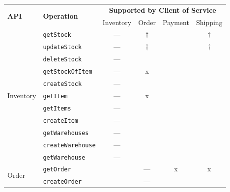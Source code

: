 \begin{table}[!htb]
    \centering
    \begin{tabular}{@{}llcccc@{}}
        \toprule
        \multirow{2}{*}{\textbf{\ac{API}}}  & \multirow{2}{*}{\textbf{Operation}}   & \multicolumn{4}{c}{\textbf{Supported by Client of Service}} \\
                                            &                                       & Inventory & Order     & Payment   & Shipping \\
        \midrule
        \multirow{11}{*}{Inventory}         & \texttt{getStock}                     & ---       & $\dagger$ &           & $\dagger$ \\
                                            & \texttt{updateStock}                  & ---       & $\dagger$ &           & $\dagger$ \\
                                            & \texttt{deleteStock}                  & ---       &           &           & \\
                                            & \texttt{getStockOfItem}               & ---       & x         &           & \\
                                            & \texttt{createStock}                  & ---       &           &           & \\
                                            & \texttt{getItem}                      & ---       & x         &           & \\
                                            & \texttt{getItems}                     & ---       &           &           & \\
                                            & \texttt{createItem}                   & ---       &           &           & \\
                                            & \texttt{getWarehouses}                & ---       &           &           & \\
                                            & \texttt{createWarehouse}              & ---       &           &           & \\
                                            & \texttt{getWarehouse}                 & ---       &           &           & \\
        \midrule
        \multirow{4}{*}{Order}              & \texttt{getOrder}                     &           & ---       & x         & x \\
                                            & \texttt{createOrder}                  &           & ---       &           & \\

\end{tabular}
\end{table}
